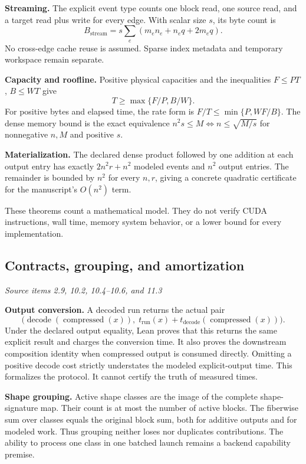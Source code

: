 \textbf{Streaming.} The explicit event type counts one block read, one source read, and a target read plus write for every edge. With scalar size $s$, its byte count is
\[
B_{\mathrm{stream}}=s\sum_e(m_en_e+n_eq+2m_eq).
\]
No cross-edge cache reuse is assumed. Sparse index metadata and temporary workspace remain separate.

\textbf{Capacity and roofline.} Positive physical capacities and the inequalities $F\leq PT$, $B\leq WT$ give
\[
T\geq\max\{F/P,B/W\}.
\]
For positive bytes and elapsed time, the rate form is $F/T\leq\min\{P,WF/B\}$. The dense memory bound is the exact equivalence $n^2s\leq M\iff n\leq\sqrt{M/s}$ for nonnegative $n,M$ and positive $s$.

\textbf{Materialization.} The declared dense product followed by one addition at each output entry has exactly $2n^2r+n^2$ modeled events and $n^2$ output entries. The remainder is bounded by $n^2$ for every $n,r$, giving a concrete quadratic certificate for the manuscript's $O(n^2)$ term.

These theorems count a mathematical model. They do not verify CUDA instructions, wall time, memory system behavior, or a lower bound for every implementation.



\subsection{Contracts, grouping, and amortization}\label{supp2:subsection:006}\textit{Source items 2.9, 10.2, 10.4--10.6, and 11.3}\par
\textbf{Output conversion.} A decoded run returns the actual pair
\[
\bigl(\operatorname{decode}(\operatorname{compressed}(x)),
\;t_{\mathrm{run}}(x)+t_{\mathrm{decode}}(\operatorname{compressed}(x))\bigr).
\]
Under the declared output equality, Lean proves that this returns the same explicit result and charges the conversion time. It also proves the downstream composition identity when compressed output is consumed directly. Omitting a positive decode cost strictly understates the modeled explicit-output time. This formalizes the protocol. It cannot certify the truth of measured times.

\textbf{Shape grouping.} Active shape classes are the image of the complete shape-signature map. Their count is at most the number of active blocks. The fiberwise sum over classes equals the original block sum, both for additive outputs and for modeled work. Thus grouping neither loses nor duplicates contributions. The ability to process one class in one batched launch remains a backend capability premise.

